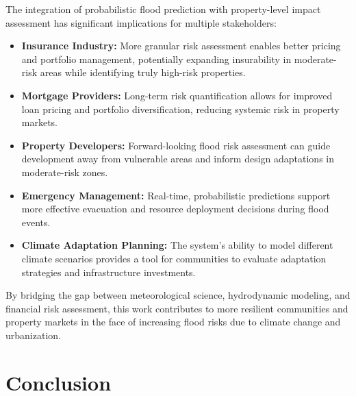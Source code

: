 \documentclass{article}
\begin{document}
The integration of probabilistic flood prediction with property-level impact assessment has significant implications for multiple stakeholders:

\begin{itemize}
    \item \textbf{Insurance Industry:} More granular risk assessment enables better pricing and portfolio management, potentially expanding insurability in moderate-risk areas while identifying truly high-risk properties.
    
    \item \textbf{Mortgage Providers:} Long-term risk quantification allows for improved loan pricing and portfolio diversification, reducing systemic risk in property markets.
    
    \item \textbf{Property Developers:} Forward-looking flood risk assessment can guide development away from vulnerable areas and inform design adaptations in moderate-risk zones.
    
    \item \textbf{Emergency Management:} Real-time, probabilistic predictions support more effective evacuation and resource deployment decisions during flood events.
    
    \item \textbf{Climate Adaptation Planning:} The system's ability to model different climate scenarios provides a tool for communities to evaluate adaptation strategies and infrastructure investments.
\end{itemize}

By bridging the gap between meteorological science, hydrodynamic modeling, and financial risk assessment, this work contributes to more resilient communities and property markets in the face of increasing flood risks due to climate change and urbanization.

\section{Conclusion}
\end{document}
